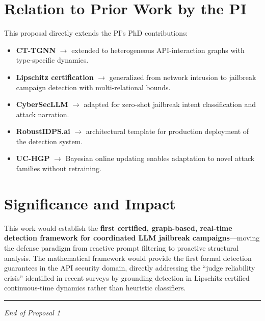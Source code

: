 \documentclass[12pt,a4paper]{article}
\begin{document}
\section{Relation to Prior Work by the PI}

This proposal directly extends the PI's PhD contributions:

\begin{itemize}
    \item \textbf{CT-TGNN} $\to$ extended to heterogeneous API-interaction graphs with type-specific dynamics.
    \item \textbf{Lipschitz certification} $\to$ generalized from network intrusion to jailbreak campaign detection with multi-relational bounds.
    \item \textbf{CyberSecLLM} $\to$ adapted for zero-shot jailbreak intent classification and attack narration.
    \item \textbf{RobustIDPS.ai} $\to$ architectural template for production deployment of the detection system.
    \item \textbf{UC-HGP} $\to$ Bayesian online updating enables adaptation to novel attack families without retraining.
\end{itemize}

\section{Significance and Impact}

This work would establish the \textbf{first certified, graph-based, real-time detection framework for coordinated LLM jailbreak campaigns}---moving the defense paradigm from reactive prompt filtering to proactive structural analysis. The mathematical framework would provide the first formal detection guarantees in the API security domain, directly addressing the ``judge reliability crisis'' identified in recent surveys by grounding detection in Lipschitz-certified continuous-time dynamics rather than heuristic classifiers.

\vspace{1cm}
\hrule
\vspace{0.3cm}
\begin{center}
\textit{End of Proposal 1}
\end{center}
\end{document}
